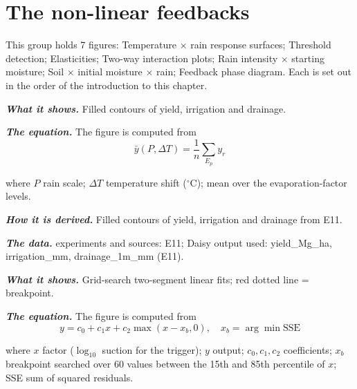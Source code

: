 \section{The non-linear feedbacks}
This group holds 7 figures: Temperature $\times$ rain response surfaces; Threshold detection; Elasticities; Two-way interaction plots; Rain intensity $\times$ starting moisture; Soil $\times$ initial moisture $\times$ rain; Feedback phase diagram. Each is set out in the order of the introduction to this chapter.
\par\vspace{6pt}\noindent{}\par\nobreak
{}\label{fig:a20_20}
\par\noindent\textbf{\color{khmag}\emph{What it shows.}} Filled contours of yield, irrigation and drainage.
\par\noindent\textbf{\color{khmag}\emph{The equation.}} The figure is computed from
\begin{equation}\boxed{\bar y(P,\Delta T)=\dfrac1n\sum_{E_p} y_r}\end{equation}
\par\noindent where $P$ rain scale; $\Delta T$ temperature shift ($^\circ$C); mean over the evaporation-factor levels.
\par\noindent\textbf{\color{khmag}\emph{How it is derived.}} Filled contours of yield, irrigation and drainage from E11.
\par\noindent\textbf{\color{khmag}\emph{The data.}} experiments and sources: E11; Daisy output used: yield\_Mg\_ha, irrigation\_mm, drainage\_1m\_mm (E11).
\par\vspace{6pt}\noindent{}\par\nobreak
{}\label{fig:a20_21}
\par\noindent\textbf{\color{khmag}\emph{What it shows.}} Grid-search two-segment linear fits; red dotted line = breakpoint.
\par\noindent\textbf{\color{khmag}\emph{The equation.}} The figure is computed from
\begin{equation}\boxed{y=c_0+c_1x+c_2\max(x-x_b,0),\quad x_b=\arg\min\mathrm{SSE}}\end{equation}
\par\noindent where $x$ factor ($\log_{10}$ suction for the trigger); $y$ output; $c_0,c_1,c_2$ coefficients; $x_b$ breakpoint searched over 60 values between the 15th and 85th percentile of $x$; SSE sum of squared residuals.

